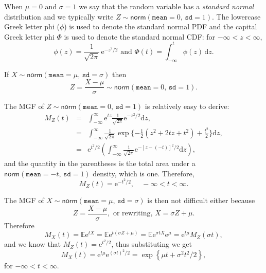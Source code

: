\documentclass[captions=tableheading]{scrbook}
\begin{document}
When \(\mu=0\) and \(\sigma=1\) we say that the random variable has a \emph{standard normal} distribution and we typically write \(Z\sim\mathsf{norm}(\mathtt{mean}=0,\,\mathtt{sd}=1)\). The lowercase Greek letter phi (\(\phi\)) is used to denote the standard normal PDF and the capital Greek letter phi \(\Phi\) is used to denote the standard normal CDF: for \(-\infty<z<\infty\),
\begin{equation}
\phi(z)=\frac{1}{\sqrt{2\pi}}\,\mathrm{e}^{-z^{2}/2}\mbox{ and }\Phi(t)=\int_{-\infty}^{t}\phi(z)\,\mathrm{d} z.
\end{equation}

\begin{prop}
If \(X\sim\mathsf{norm}(\mathtt{mean}=\mu,\,\mathtt{sd}=\sigma)\) then
\begin{equation}
Z=\frac{X-\mu}{\sigma}\sim\mathsf{norm}(\mathtt{mean}=0,\,\mathtt{sd}=1).
\end{equation}
\end{prop}

The MGF of \(Z\sim\mathsf{norm}(\mathtt{mean}=0,\,\mathtt{sd}=1)\) is relatively easy to derive:
\begin{eqnarray*}
M_{Z}(t) & = & \int_{-\infty}^{\infty}\mathrm{e}^{tz}\frac{1}{\sqrt{2\pi}}\mathrm{e}^{-z^{2}/2}\mathrm{d} z,\\
 & = & \int_{-\infty}^{\infty}\frac{1}{\sqrt{2\pi}}\exp \{ -\frac{1}{2}\left(z^{2}+2tz+t^{2}\right)+\frac{t^{2}}{2} \} \mathrm{d} z,\\
 & = & \mathrm{e}^{t^{2}/2}\left(\int_{-\infty}^{\infty}\frac{1}{\sqrt{2\pi}}\mathrm{e}^{-[z-(-t)]^{2}/2}\mathrm{d} z\right),
\end{eqnarray*}
and the quantity in the parentheses is the total area under a \(\mathsf{norm}(\mathtt{mean}=-t,\,\mathtt{sd}=1)\) density, which is one. Therefore,
\begin{equation}
M_{Z}(t)=\mathrm{e}^{-t^{2}/2},\quad -\infty < t < \infty.
\end{equation}

\begin{example}
The MGF of \(X\sim\mathsf{norm}(\mathtt{mean}=\mu,\,\mathtt{sd}=\sigma)\) is then not difficult either because 
\[
Z=\frac{X-\mu}{\sigma},\mbox{ or rewriting, }X=\sigma Z+\mu.
\]
Therefore
\[
M_{X}(t)=\mathbb{E}\mathrm{e}^{tX}=\mathbb{E}\mathrm{e}^{t(\sigma Z+\mu)}=\mathbb{E}\mathrm{e}^{\sigma tX}\mathrm{e}^{\mu}=\mathrm{e}^{t\mu}M_{Z}(\sigma t),
\]
and we know that \(M_{Z}(t)=\mathrm{e}^{t^{2}/2}\), thus substituting we get
\[
M_{X}(t)=\mathrm{e}^{t\mu}\mathrm{e}^{(\sigma t)^{2}/2}=\exp\left\{ \mu t+\sigma^{2}t^{2}/2\right\} ,
\]
for \(-\infty<t<\infty\).
\end{example}
\end{document}
